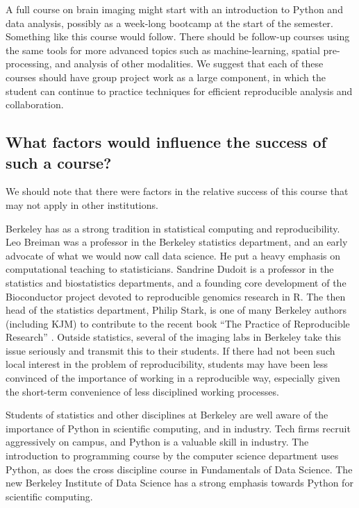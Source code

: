A full course on brain imaging might start with an introduction to Python and
data analysis, possibly as a week-long bootcamp at the start of the semester.
Something like this course would follow.  There should be follow-up courses
using the same tools for more advanced topics such as machine-learning,
spatial pre-processing, and analysis of other modalities. We suggest that each
of these courses should have group project work as a large component, in which
the student can continue to practice techniques for efficient reproducible
analysis and collaboration.

\subsection{What factors would influence the success of such a course?}

We should note that there were factors in the relative success of this
course that may not apply in other institutions.

Berkeley has as a strong tradition in statistical computing and
reproducibility.  Leo Breiman was a professor in the Berkeley statistics
department, and an early advocate of what we would now call data science.  He
put a heavy emphasis on computational teaching to statisticians.  Sandrine
Dudoit is a professor in the statistics and biostatistics departments, and a
founding core development of the Bioconductor project devoted to reproducible
genomics research in R.  The then head of the statistics department, Philip
Stark, is one of many Berkeley authors (including KJM) to contribute to the
recent book ``The Practice of Reproducible Research''
\citep{kitzes2017practice}. Outside statistics, several of the imaging labs in
Berkeley take this issue seriously and transmit this to their students.  If
there had not been such local interest in the problem of reproducibility, 
students may have been less convinced of the importance of
working in a reproducible way, especially given the short-term convenience
of less disciplined working processes.


Students of statistics and other disciplines at Berkeley are well aware of the
importance of Python in scientific computing, and in industry.  Tech firms
recruit aggressively on campus, and Python is a valuable skill in industry.
The introduction to programming course by the computer science department uses
Python, as does the cross discipline course in Fundamentals of Data Science.
The new Berkeley Institute of Data Science has a strong emphasis towards
Python for scientific computing.

